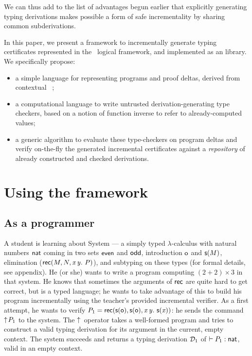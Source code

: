 \documentclass{llncs}
\begin{document}
We can thus add to the list of advantages begun earlier that
explicitly generating typing derivations makes possible a form of safe
incrementality by sharing common subderivations.

In this paper, we present a framework to incrementally generate typing
certificates represented in the \LF\ logical framework, and implemented
as an  library. We specifically propose:
\begin{itemize}
\item a simple language for representing programs and proof
  deltas, derived from contextual \LF\ \cite{nanevski2008contextual};
\item a computational language to write untrusted
  derivation-generating type checkers, based on a notion of function
  inverse
  to refer to already-computed values;
\item a generic algorithm to evaluate these type-checkers on program
  deltas and verify on-the-fly the generated incremental certificates
  against a \emph{repository} of already constructed and checked
  derivations.
\end{itemize}

\section{Using the framework}

\subsection{As a programmer}
\label{sec:use-incremental}

A student is learning about System  --- a simply
typed $\lambda$-calculus with natural numbers $\text{\textsf{nat}}$ coming in
two sets $\text{\textsf{even}}$ and $\text{\textsf{odd}}$, introduction $\text{\textsf{o}}$ and $\text{\textsf{s}} ({M})$,
elimination ($\text{\textsf{rec}}({M},{N},{\text{\textit{x}}}\,{\text{\textit{y}}}.\ {P})$), and subtyping on these types (for
formal details, see appendix). He (or she) wants to write a program
computing $(2+2)\times 3$ in that system. He knows that sometimes the
arguments of $\text{\textsf{rec}}$ are quite hard to get correct, but
 is a typed language; he wants to take advantage of
this to build his program incrementally using the teacher's provided
incremental verifier. As a first attempt, he wants to verify $P_1 =
\text{\textsf{rec}}({\text{\textsf{s}} ({\text{\textsf{o}}})},{\text{\textsf{s}} ({\text{\textsf{o}}})},{\text{\textit{x}}}\,{\text{\textit{y}}}.\ {\text{\textsf{s}} ({\text{\textit{x}}})})$: he sends the command
$\uparrow\!{P_1}$ to the system. The $\uparrow\!{}$ operator takes a
well-formed program and tries to construct a valid typing derivation
for its argument in the current, empty context. The system succeeds
and returns a typing derivation $\mathcal D_1$ of \/ $\vdash P_1 :
\text{\textsf{nat}}$, valid in an empty context.
\end{document}
